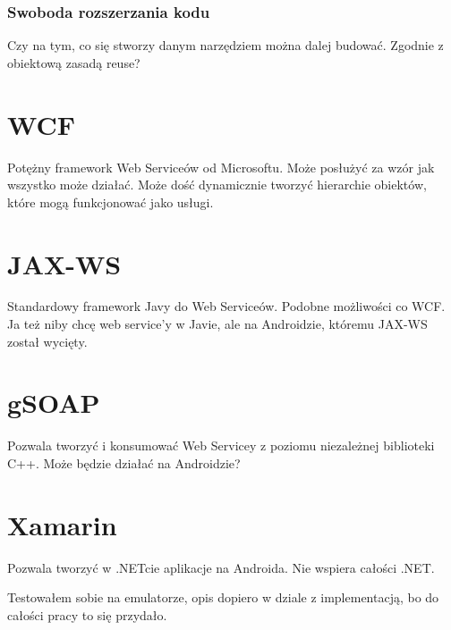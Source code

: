 \subsubsection{Swoboda rozszerzania kodu}
Czy na tym, co się stworzy danym narzędziem można dalej budować. Zgodnie z obiektową zasadą reuse?

\section{WCF}
Potężny framework Web Serviceów od Microsoftu. Może posłużyć za wzór jak wszystko może działać. Może dość dynamicznie tworzyć hierarchie obiektów, które mogą funkcjonować jako usługi.


\section{JAX-WS}
Standardowy framework Javy do Web Serviceów. Podobne możliwości co WCF. Ja też niby chcę web service'y w Javie, ale na Androidzie, któremu JAX-WS został wycięty.

\section{gSOAP}
Pozwala tworzyć i konsumować Web Servicey z poziomu niezależnej biblioteki C++. Może będzie działać na Androidzie?

\section{Xamarin}
Pozwala tworzyć w .NETcie aplikacje na Androida. Nie wspiera całości .NET.

Testowałem sobie na emulatorze, opis dopiero w dziale z implementacją, bo do całości pracy to się przydało.


